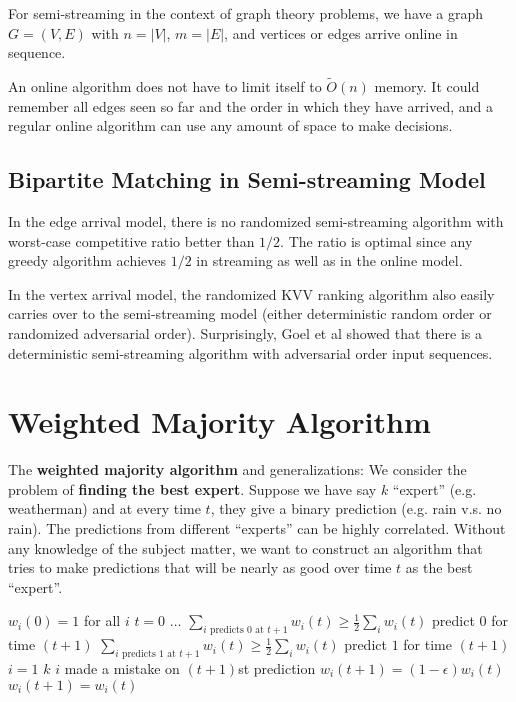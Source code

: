 For semi-streaming in the context of graph theory problems, we have a graph $G = (V,E)$ with $n = |V|$, $m = |E|$, and vertices or edges arrive online in sequence.

An online algorithm does not have to limit itself to $\widetilde{O}(n)$ memory. It could remember all edges seen so far and the order in which they have arrived, and a regular online algorithm can use any amount of space to make decisions.

\subsection{Bipartite Matching in Semi-streaming Model}

In the edge arrival model, there is no randomized semi-streaming algorithm with worst-case competitive ratio better than $1/2$. The ratio is optimal since any greedy algorithm achieves $1/2$ in streaming as well as in the online model.

In the vertex arrival model, the randomized KVV ranking algorithm also easily carries over to the semi-streaming model (either deterministic random order or randomized adversarial order). Surprisingly, Goel et al showed that there is a deterministic semi-streaming algorithm with adversarial order input sequences.

\section{Weighted Majority Algorithm}

The \textbf{weighted majority algorithm} and generalizations: We consider the problem of \textbf{finding the best expert}. Suppose we have say $k$ ``expert'' (e.g. weatherman) and at every time $t$, they give a binary prediction (e.g. rain v.s. no rain). The predictions from different ``experts'' can be highly correlated. Without any knowledge of the subject matter, we want to construct an algorithm that tries to make predictions that will be nearly as good over time $t$ as the best ``expert''.

\begin{codebox}
    \li $w_i(0) = 1$ for all $i$
    \li \For $t = 0$ \To $\ldots$ \Do
        \li \If $\sum_{\text{$i$ predicts 0 at $t+1$}} w_i(t) \geq \frac{1}{2} \sum_{i} w_i(t)$ \Then
            \li predict $0$ for time $(t+1)$
        \li \ElseIf $\sum_{\text{$i$ predicts 1 at $t+1$}} w_i(t) \geq \frac{1}{2} \sum_{i} w_i(t)$ \Then
            \li predict $1$ for time $(t+1)$
        \End
        \li \For $i = 1$ \To $k$ \Do
            \li \If $i$ made a mistake on $(t+1)$st prediction \Then
                \li $w_i(t+1) = (1-\epsilon)w_i(t)$
            \li \Else
                \li $w_i(t+1) = w_i(t)$
            \End
        \End
    \End
\end{codebox}

